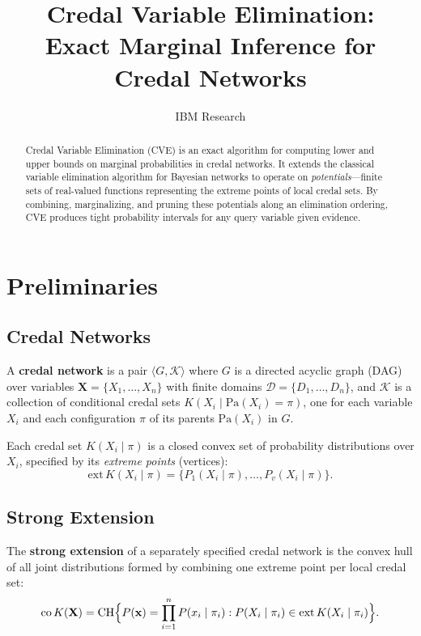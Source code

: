 \documentclass[11pt]{article}
\title{Credal Variable Elimination:\\Exact Marginal Inference for Credal Networks}
\author{IBM Research}
\date{}
\theoremstyle{definition}
\begin{document}
\maketitle

\begin{abstract}
Credal Variable Elimination (CVE) is an exact algorithm for computing lower and upper
bounds on marginal probabilities in credal networks. It extends the classical variable
elimination algorithm for Bayesian networks to operate on \emph{potentials}---finite
sets of real-valued functions representing the extreme points of local credal sets.
By combining, marginalizing, and pruning these potentials along an elimination ordering,
CVE produces tight probability intervals for any query variable given evidence.
\end{abstract}

\section{Preliminaries}

\subsection{Credal Networks}

A \textbf{credal network} is a pair $\langle G, \mathcal{K} \rangle$ where $G$ is a
directed acyclic graph (DAG) over variables $\mathbf{X} = \{X_1, \dots, X_n\}$ with
finite domains $\mathcal{D} = \{D_1, \dots, D_n\}$, and $\mathcal{K}$ is a collection
of conditional credal sets $K(X_i \mid \mathrm{Pa}(X_i) = \pi)$, one for each variable
$X_i$ and each configuration $\pi$ of its parents $\mathrm{Pa}(X_i)$ in $G$.

Each credal set $K(X_i \mid \pi)$ is a closed convex set of probability distributions
over $X_i$, specified by its \emph{extreme points} (vertices):
\[
  \mathrm{ext}\, K(X_i \mid \pi) = \{P_1(X_i \mid \pi), \dots, P_{v}(X_i \mid \pi)\}.
\]

\subsection{Strong Extension}

The \textbf{strong extension} of a separately specified credal network is the convex
hull of all joint distributions formed by combining one extreme point per local credal
set:
\begin{equation}\label{eq:strong-ext}
  \mathrm{co}\,K(\mathbf{X}) = \mathrm{CH}\Bigl\{
    P(\mathbf{x}) = \prod_{i=1}^{n} P(x_i \mid \pi_i) :
    P(X_i \mid \pi_i) \in \mathrm{ext}\,K(X_i \mid \pi_i)
  \Bigr\}.
\end{equation}
\end{document}
